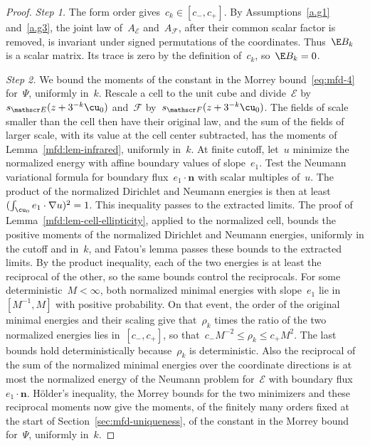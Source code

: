 \documentclass[11pt]{amsart}
\begin{document}
\begin{proof}

\emph{Step 1.} The form order gives~$c_k\in[c_-,c_+]$. By Assumptions~\ref{a.g1} and~\ref{a.g3}, the joint law of~$A_{\mathscr E}$ and~$A_{\mathscr F}$, after their common scalar factor is removed, is invariant under signed permutations of the coordinates. Thus~$\E B_k$ is a scalar matrix. Its trace is zero by the definition of~$c_k$, so~$\E B_k=0$.

\smallskip

\emph{Step 2.} We bound the moments of the constant in the Morrey bound~\eqref{eq:mfd-4} for~$\Psi$, uniformly in~$k$. Rescale a cell to the unit cube and divide~$\mathscr E$ by~$s_{\mathscr E}(z+3^{-k}\cu_0)$ and~$\mathscr F$ by~$s_{\mathscr F}(z+3^{-k}\cu_0)$. The fields of scale smaller than the cell then have their original law, and the sum of the fields of larger scale, with its value at the cell center subtracted, has the moments of Lemma~\ref{mfd:lem-infrared}, uniformly in~$k$. At finite cutoff, let~$u$ minimize the normalized energy with affine boundary values of slope~$e_1$. Test the Neumann variational formula for boundary flux~$e_1\cdot\mathbf n$ with scalar multiples of~$u$. The product of the normalized Dirichlet and Neumann energies is then at least~$(\int_{\cu_0}e_1\cdot\nabla u)^2=1$. This inequality passes to the extracted limits. The proof of Lemma~\ref{mfd:lem-cell-ellipticity}, applied to the normalized cell, bounds the positive moments of the normalized Dirichlet and Neumann energies, uniformly in the cutoff and in~$k$, and Fatou's lemma passes these bounds to the extracted limits. By the product inequality, each of the two energies is at least the reciprocal of the other, so the same bounds control the reciprocals. For some deterministic~$M<\infty$, both normalized minimal energies with slope~$e_1$ lie in~$[M^{-1},M]$ with positive probability. On that event, the order of the original minimal energies and their scaling give that~$\rho_k$ times the ratio of the two normalized energies lies in~$[c_-,c_+]$, so that~$c_-M^{-2}\leq \rho_k\leq c_+M^2$. The last bounds hold deterministically because~$\rho_k$ is deterministic. Also the reciprocal of the sum of the normalized minimal energies over the coordinate directions is at most the normalized energy of the Neumann problem for~$\mathscr E$ with boundary flux~$e_1\cdot\mathbf n$. H\"older's inequality, the Morrey bounds for the two minimizers and these reciprocal moments now give the moments, of the finitely many orders fixed at the start of Section~\ref{sec:mfd-uniqueness}, of the constant in the Morrey bound for~$\Psi$, uniformly in~$k$.


\end{proof}
\end{document}
